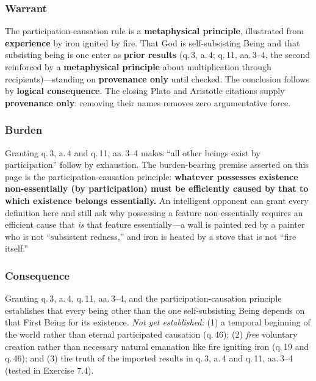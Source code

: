 \subsubsection*{Warrant}

The participation-causation rule is a \textbf{metaphysical principle}, illustrated from \textbf{experience} by iron ignited by fire. That God is self-subsisting Being and that subsisting being is one enter as \textbf{prior results} (q.\,3, a.\,4; q.\,11, aa.\,3--4, the second reinforced by a \textbf{metaphysical principle} about multiplication through recipients)---standing on \textbf{provenance only} until checked. The conclusion follows by \textbf{logical consequence}. The closing Plato and Aristotle citations supply \textbf{provenance only}: removing their names removes zero argumentative force.

\subsubsection*{Burden}

Granting q.\,3, a.\,4 and q.\,11, aa.\,3--4 makes ``all other beings exist by participation'' follow by exhaustion. The burden-bearing premise asserted on this page is the participation-causation principle: \textbf{whatever possesses existence non-essentially (by participation) must be efficiently caused by that to which existence belongs essentially.} An intelligent opponent can grant every definition here and still ask why possessing a feature non-essentially requires an efficient cause that \emph{is} that feature essentially---a wall is painted red by a painter who is not ``subsistent redness,'' and iron is heated by a stove that is not ``fire itself.''

\subsubsection*{Consequence}

Granting q.\,3, a.\,4, q.\,11, aa.\,3--4, and the participation-causation principle establishes that every being other than the one self-subsisting Being depends on that First Being for its existence. \emph{Not yet established:} (1) a temporal beginning of the world rather than eternal participated causation (q.\,46); (2) \emph{free} voluntary creation rather than necessary natural emanation like fire igniting iron (q.\,19 and q.\,46); and (3) the truth of the imported results in q.\,3, a.\,4 and q.\,11, aa.\,3--4 (tested in Exercise 7.4).

